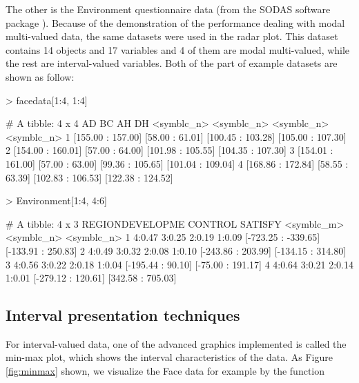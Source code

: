 \documentclass[article]{jss}
\begin{document}
The other is the Environment questionnaire data (from the SODAS software package \cite{diday:2008}). Because of the demonstration of the performance dealing with modal multi-valued data, the same datasets were used in the radar plot. This dataset contains 14 objects and 17 variables and 4 of them are modal multi-valued, while the rest are interval-valued variables. Both of the part of example datasets are shown as follow:

\begin{Schunk}
\begin{Sinput}
> facedata[1:4, 1:4]
\end{Sinput}
\begin{Soutput}
# A tibble: 4 x 4
                 AD              BC                AH                DH
         <symblc_n>      <symblc_n>        <symblc_n>        <symblc_n>
1 [155.00 : 157.00] [58.00 : 61.01] [100.45 : 103.28] [105.00 : 107.30]
2 [154.00 : 160.01] [57.00 : 64.00] [101.98 : 105.55] [104.35 : 107.30]
3 [154.01 : 161.00] [57.00 : 63.00]  [99.36 : 105.65] [101.04 : 109.04]
4 [168.86 : 172.84] [58.55 : 63.39] [102.83 : 106.53] [122.38 : 124.52]
\end{Soutput}
\begin{Sinput}
> Environment[1:4, 4:6]
\end{Sinput}
\begin{Soutput}
# A tibble: 4 x 3
              REGIONDEVELOPME             CONTROL            SATISFY
                   <symblc_m>          <symblc_n>         <symblc_n>
1 4:0.47 3:0.25 2:0.19 1:0.09 [-723.25 : -339.65] [-133.91 : 250.83]
2 4:0.49 3:0.32 2:0.08 1:0.10  [-243.86 : 203.99] [-134.15 : 314.80]
3 4:0.56 3:0.22 2:0.18 1:0.04   [-195.44 : 90.10]  [-75.00 : 191.17]
4 4:0.64 3:0.21 2:0.14 1:0.01  [-279.12 : 120.61]  [342.58 : 705.03]
\end{Soutput}
\end{Schunk}


\subsection{Interval presentation techniques}

For interval-valued data, one of the advanced graphics implemented is called the min-max plot, which shows the interval characteristics of the data. As Figure \ref{fig:minmax} shown, we visualize the Face data for example by the function 
\end{document}
